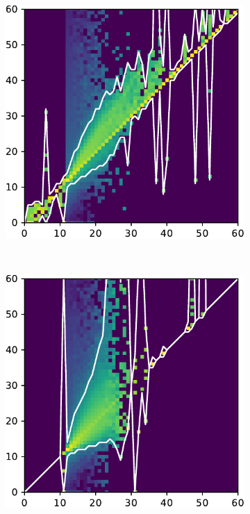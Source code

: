 \documentclass[10pt,letterpaper]{article}
\begin{document}
				\begin{figure}[h!]
					\centering
					\begin{subfigure}[t]{0.32\textwidth}
						\centering
						\includegraphics[width=\textwidth]{fig/hist_0}
					\end{subfigure}
					~ 
					\begin{subfigure}[t]{0.32\textwidth}
						\centering
						\includegraphics[width=\textwidth]{fig/hist_1}

\end{subfigure}
\end{figure}
\end{document}
